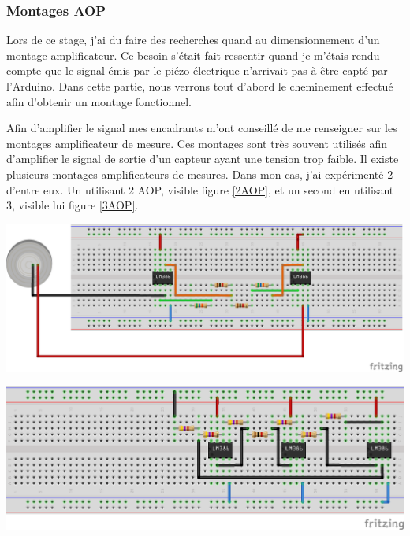 \documentclass[12pt,french,a4paper]{article}
\begin{document}
\subsubsection{Montages AOP}
Lors de ce stage, j'ai du faire des recherches quand au dimensionnement d'un montage amplificateur. Ce besoin s'était fait ressentir quand je m'étais rendu compte que le signal émis par le piézo-électrique n'arrivait pas à être capté par l'Arduino.  Dans cette partie, nous verrons tout d'abord le cheminement effectué afin d'obtenir un montage fonctionnel. 

Afin d'amplifier le signal mes encadrants m'ont conseillé de me renseigner sur les montages amplificateur de mesure. Ces montages sont très souvent utilisés afin d’amplifier le signal de sortie d’un capteur ayant une tension trop faible.
Il existe plusieurs montages amplificateurs de mesures. Dans mon cas, j’ai expérimenté 2 d'entre eux. Un utilisant 2 AOP, visible figure \ref{2AOP}, et un second en utilisant 3, visible lui figure \ref{3AOP}. 

\begin{center}	
\includegraphics[scale=0.80]{../img/instrumentation2aop_bb.png}
\label{2AOP}
\end{center}

\begin{center}	
\includegraphics[scale=1]{../img/instrumentation3aop_bb.png}
\label{3AOP}
\end{center}
\end{document}
